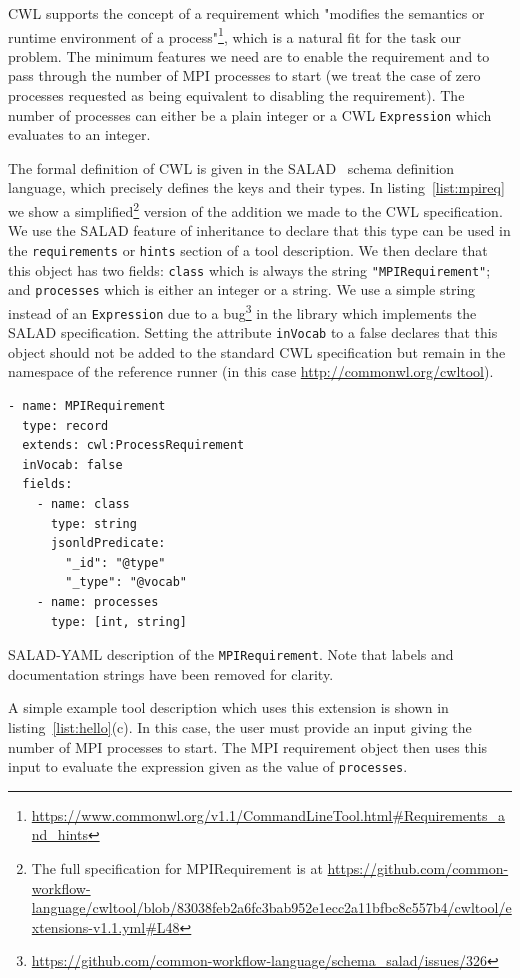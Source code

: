 \documentclass[conference]{IEEEtran}
\newcommand{\cwl}[1]{\texttt{#1}}
\begin{document}
CWL supports the concept of a requirement which "modifies the semantics or runtime environment of a process"\footnote{\url{https://www.commonwl.org/v1.1/CommandLineTool.html#Requirements_and_hints}}, which is a natural fit for the task our problem. The minimum features we need are to enable the requirement and to pass through the number of MPI processes to start (we treat the case of zero processes requested as being equivalent to disabling the requirement). The number of processes can either be a plain integer or a CWL \cwl{Expression} which evaluates to an integer.

The formal definition of CWL is given in the SALAD~\cite{salad} schema definition language, which precisely defines the  keys and their types. In listing~\ref{list:mpireq} we show a simplified\footnote{The full specification for MPIRequirement is at \url{https://github.com/common-workflow-language/cwltool/blob/83038feb2a6fc3bab952e1ecc2a11bfbc8c557b4/cwltool/extensions-v1.1.yml#L48}} version of the addition we made to the CWL specification. We use the SALAD feature of inheritance to declare that this type can be used in the \cwl{requirements} or \cwl{hints} section of a tool description. We then declare that this object has two fields: \cwl{class} which is always the string \cwl{"MPIRequirement"}; and \cwl{processes} which is either an integer or a string. We use a simple string instead of an \cwl{Expression} due to a bug\footnote{\url{https://github.com/common-workflow-language/schema_salad/issues/326}} in the library which implements the SALAD specification. Setting the attribute \cwl{inVocab} to a false declares that this object should not be added to the standard CWL specification but remain in the namespace of the reference runner (in this case \url{http://commonwl.org/cwltool}).

\begin{listing}
\begin{verbatim}
- name: MPIRequirement
  type: record
  extends: cwl:ProcessRequirement
  inVocab: false
  fields:
    - name: class
      type: string
      jsonldPredicate:
        "_id": "@type"
        "_type": "@vocab"
    - name: processes
      type: [int, string]
\end{verbatim}
\caption{SALAD-YAML description of the \cwl{MPIRequirement}. Note that labels and documentation strings have been removed for clarity.}
\label{list:mpireq}
\end{listing}

A simple example tool description which uses this extension is shown in listing~\ref{list:hello}(c). In this case, the user must provide an input giving the number of MPI processes to start. The MPI requirement object then uses this input to evaluate the expression given as the value of \cwl{processes}.
\end{document}
